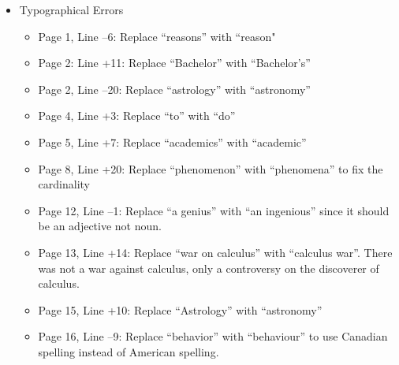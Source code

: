 \documentclass[11pt]{article}
\begin{document}
\begin{itemize}
	\item Typographical Errors
	\begin{itemize}
		\item Page 1, Line --6: Replace ``reasons” with ``reason"
		\item Page 2: Line +11: Replace ``Bachelor” with ``Bachelor’s”
		\item Page 2, Line --20: Replace ``astrology” with ``astronomy”
		\item Page 4, Line +3: Replace ``to” with ``do”
		\item Page 5, Line +7: Replace ``academics” with ``academic”
		\item Page 8, Line +20: Replace ``phenomenon” with ``phenomena” to fix the cardinality
		\item Page 12, Line --1: Replace ``a genius” with ``an ingenious” since it should be an adjective not noun.
		\item Page 13, Line +14: Replace ``war on calculus” with ``calculus war”. There was not a war against calculus, only a controversy on the discoverer of calculus.
		\item Page 15, Line +10: Replace ``Astrology” with ``astronomy”
		\item Page 16, Line --9: Replace ``behavior” with ``behaviour” to use Canadian spelling instead of American spelling.
	\end{itemize}
	

\end{itemize}
\end{document}
